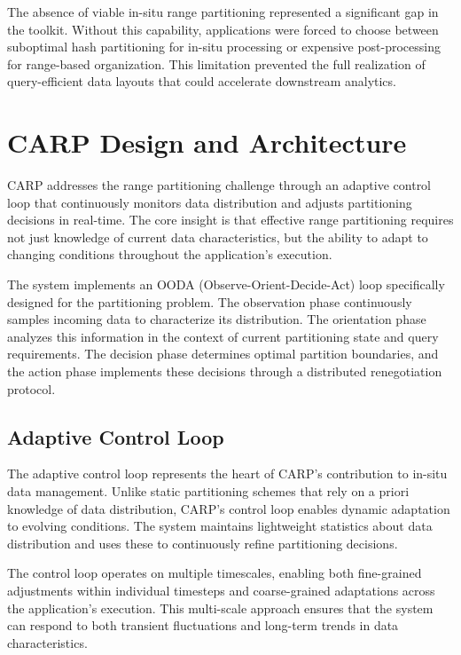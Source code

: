 The absence of viable in-situ range partitioning represented a significant gap in the toolkit.
Without this capability, applications were forced to choose between suboptimal hash partitioning
for in-situ processing or expensive post-processing for range-based organization.
This limitation prevented the full realization of query-efficient data layouts that could
accelerate downstream analytics.

\section{CARP Design and Architecture}

CARP addresses the range partitioning challenge through an adaptive control loop that continuously
monitors data distribution and adjusts partitioning decisions in real-time.
The core insight is that effective range partitioning requires not just knowledge of current data
characteristics, but the ability to adapt to changing conditions throughout the application's
execution.

The system implements an OODA (Observe-Orient-Decide-Act) loop specifically designed for the
partitioning problem.
The observation phase continuously samples incoming data to characterize its distribution.
The orientation phase analyzes this information in the context of current partitioning state and
query requirements.
The decision phase determines optimal partition boundaries, and the action phase implements these
decisions through a distributed renegotiation protocol.

\subsection{Adaptive Control Loop}

The adaptive control loop represents the heart of CARP's contribution to in-situ data management.
Unlike static partitioning schemes that rely on a priori knowledge of data distribution, CARP's
control loop enables dynamic adaptation to evolving conditions.
The system maintains lightweight statistics about data distribution and uses these to continuously
refine partitioning decisions.

The control loop operates on multiple timescales, enabling both fine-grained adjustments within
individual timesteps and coarse-grained adaptations across the application's execution.
This multi-scale approach ensures that the system can respond to both transient fluctuations and
long-term trends in data characteristics.

